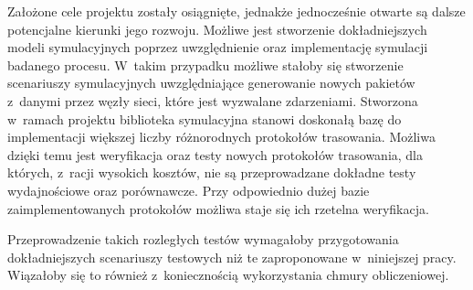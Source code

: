 Założone cele projektu zostały osiągnięte, jednakże jednocześnie otwarte są dalsze potencjalne kierunki jego rozwoju. Możliwe jest stworzenie dokładniejszych modeli symulacyjnych poprzez uwzględnienie oraz implementację symulacji badanego procesu. W~takim przypadku możliwe stałoby się stworzenie scenariuszy symulacyjnych uwzględniające generowanie nowych pakietów z~danymi przez węzły sieci, które jest wyzwalane zdarzeniami.
Stworzona w~ramach projektu biblioteka symulacyjna stanowi doskonałą bazę do implementacji większej liczby różnorodnych protokołów trasowania. Możliwa dzięki temu jest weryfikacja oraz testy nowych protokołów trasowania, dla których, z~racji wysokich kosztów, nie są przeprowadzane dokładne testy wydajnościowe oraz porównawcze. Przy odpowiednio dużej bazie zaimplementowanych protokołów możliwa staje się ich rzetelna weryfikacja.

Przeprowadzenie takich rozległych testów wymagałoby przygotowania dokładniejszych scenariuszy testowych niż te zaproponowane w~niniejszej pracy. Wiązałoby się to również z~koniecznością wykorzystania chmury obliczeniowej.

